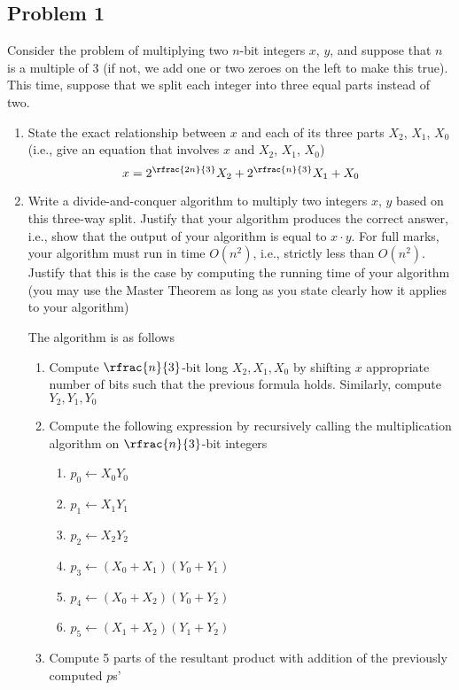 \documentclass[11pt]{article}
\begin{document}
\subsection*{Problem 1}

Consider the problem of multiplying two $n$-bit integers $x$, $y$, and suppose that $n$ is a multiple of 3 (if not, we add one or two zeroes on the left to make this true). This time, suppose that we split each integer into three equal parts instead of two.

\begin{enumerate}
  \item State the exact relationship between $x$ and each of its three parts $X_2$, $X_1$, $X_0$ (i.e., give an equation that involves $x$ and $X_2$, $X_1$, $X_0$)
    \[
      x = 2^{\rfrac{2n}{3}}X_{2} + 2^{\rfrac{n}{3}}X_{1} + X_{0}
    \]
  \item Write a divide-and-conquer algorithm to multiply two integers $x$, $y$ based on this three-way split. Justify that your algorithm produces the correct answer, i.e., show that the output of your algorithm is equal to $x\cdot y$. For full marks, your algorithm must run in time $O(n^2)$, i.e., strictly less than $O(n^2)$. Justify that this is the case by computing the running time of your algorithm (you may use the Master Theorem as long as you state clearly how it applies to your algorithm)
  \begin{solution}
    The algorithm is as follows
    \begin{enumerate}
      \item Compute $\rfrac{n}{3}$-bit long $X_2, X_1, X_0$ by shifting $x$ appropriate number of bits such that the previous formula holds. Similarly, compute $Y_2, Y_1, Y_0$
      \item Compute the following expression by recursively calling the multiplication algorithm on $\rfrac{n}{3}$-bit integers
      \begin{enumerate}
        \item $p_0\leftarrow X_0 Y_0$
        \item $p_1\leftarrow X_1 Y_1$
        \item $p_2\leftarrow X_2 Y_2$
        \item $p_3\leftarrow (X_0 + X_1)(Y_0 + Y_1)$
        \item $p_4\leftarrow (X_0 + X_2)(Y_0 + Y_2)$
        \item $p_5\leftarrow(X_1 + X_2)(Y_1 + Y_2)$
      \end{enumerate}
      \item Compute 5 parts of the resultant product with addition of the previously computed $p$s'

\end{enumerate}
\end{solution}
\end{enumerate}
\end{document}
